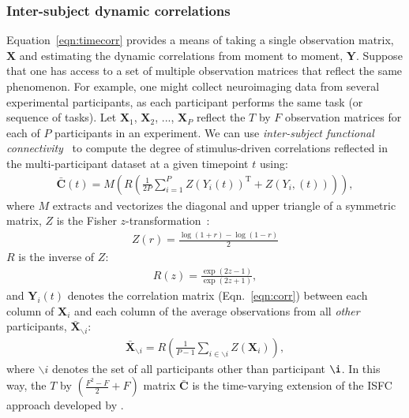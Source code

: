 \documentclass[english]{article}
\begin{document}
\subsubsection*{Inter-subject dynamic correlations}
Equation~\ref{eqn:timecorr} provides a means of taking a single
observation matrix, $\mathbf{X}$ and estimating the dynamic
correlations from moment to moment, $\mathbf{Y}$.  Suppose that one
has access to a set of multiple observation matrices that reflect the
same phenomenon.  For example, one might collect neuroimaging data
from several experimental participants, as each participant performs
the same task (or sequence of tasks).  Let $\mathbf{X}_1$,
$\mathbf{X}_2$, ..., $\mathbf{X}_P$ reflect the $T$ by $F$ observation
matrices for each of $P$ participants in an experiment.  We can use
\textit{inter-subject functional connectivity}~\citep[ISFC;
][]{SimoEtal16} to compute the degree of stimulus-driven correlations
reflected in the multi-participant dataset at a given timepoint $t$
using:
\begin{align}
\bar{\mathbf{C}}(t) = M\left(R\left(\frac{1}{2P} \sum_{i=1}^P
  Z\left(Y_i(t)\right)^\mathrm{T} + Z\left(Y_i,(t)\right)\right)\right),
\end{align}
where $M$ extracts and vectorizes the diagonal and upper triangle of a symmetric
matrix, $Z$ is the Fisher $z$-transformation~\citep{Zar10}:
\begin{align}
Z(r) = \frac{\log(1+r) - \log(1-r)}{2}
\end{align}
$R$ is the inverse of $Z$:
\begin{align}
R(z) = \frac{\exp(2z - 1)}{\exp(2z + 1)},
\end{align}
and $\mathbf{Y}_i(t)$ denotes the correlation matrix
(Eqn.~\ref{eqn:corr}) between each column of $\mathbf{X}_i$ and each
column of the average observations from all \textit{other}
participants, $\bar{\mathbf{X}}_{ \backslash i}$:
\begin{align}
  \bar{\mathbf{X}}_{ \backslash i} = R\left(\frac{1}{P-1}\sum_{i \in
  \backslash i} Z\left( \mathbf{X}_i \right) \right),
\end{align}
where $ \backslash i$ denotes the set of all participants other than
participant $\i$. In this way, the $T$ by $\left( \frac{F^2 - F}{2}
  + F \right)$
matrix $\bar{\mathbf{C}}$ is the time-varying extension of the ISFC
approach developed by \cite{SimoEtal16}.
\end{document}
